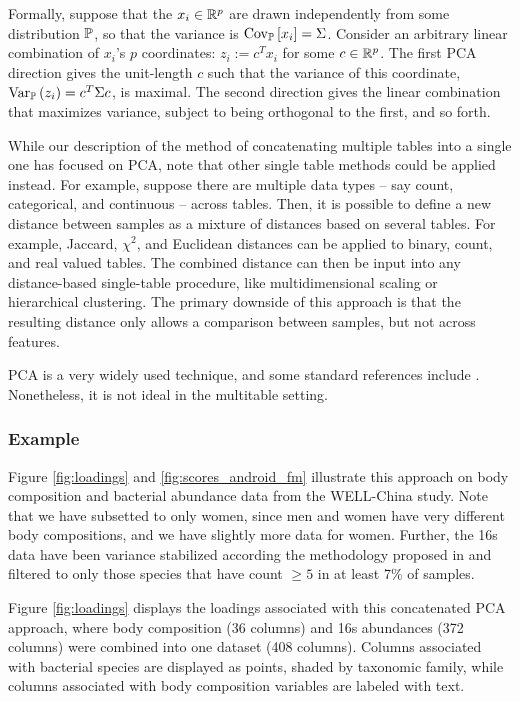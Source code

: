 \documentclass{article}
\begin{document}
Formally, suppose that the $x_{i}\in\reals^{p}$ are drawn
independently from some distribution $\P$, so that the variance is
$\Covsubarg{\P}{x_{i}} = \Sigma$. Consider an arbitrary linear combination of
$x_{i}$'s $p$ coordinates: $z_{i} := c^{T}x_{i}$ for some $c \in \reals^{p}$.
The first PCA direction gives the unit-length $c$ such that the variance of this
coordinate, $\Varsubarg{\P}{z_{i}} = c^{T}\Sigma c$, is maximal. The second
direction gives the linear combination that maximizes variance, subject to being
orthogonal to the first, and so forth.

While our description of the method of concatenating multiple tables into a
single one has focused on PCA, note that other single table methods could be
applied instead. For example, suppose there are multiple data types -- say
count, categorical, and continuous -- across tables. Then, it is possible to
define a new distance between samples as a mixture of distances based on several
tables. For example, Jaccard, $\chi^{2}$, and Euclidean distances can be applied
to binary, count, and real valued tables. The combined distance can then be
input into any distance-based single-table procedure, like multidimensional
scaling or hierarchical clustering. The primary downside of this approach is
that the resulting distance only allows a comparison between samples, but not
across features.

PCA is a very widely used technique, and some standard references include
\citep{friedman2001elements, mardia1980multivariate, pages2014multiple}.
Nonetheless, it is not ideal in the multitable setting.

\subsubsection{Example}
\label{subsubsec:pca_example}

Figure \ref{fig:loadings} and \ref{fig:scores_android_fm} illustrate this approach
on body composition and bacterial abundance data from the WELL-China study. Note
that we have subsetted to only women, since men and women have very different
body compositions, and we have slightly more data for women. Further, the 16s
data have been variance stabilized according the methodology proposed in
\citep{Anders2010} and filtered to only those species that have count $\geq 5$
in at least 7\% of samples.

Figure \ref{fig:loadings} displays the loadings associated with this
concatenated PCA approach, where body composition (36 columns) and 16s
abundances (372 columns) were combined into one dataset (408 columns). Columns
associated with bacterial species are displayed as points, shaded by taxonomic
family, while columns associated with body composition variables are labeled
with text.
\end{document}

